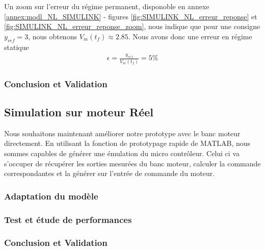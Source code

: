 		Un zoom sur l'erreur du régime permanent, disponoble en annexe \ref{annex:modl_NL_SIMULINK} - figures \ref{fig:SIMULINK_NL_erreur_reponse} et \ref{fig:SIMULINK_NL_erreur_reponse_zoom}, nous indique que pour une consigne $y_{ref} = 3$, nous obtenons $V_m(t_f)\approx 2.85$. Nous avons donc une erreur en régime statique \begin{align*}
		\epsilon = \frac{y_{ref}}{V_m(t_f)} = 5\%
		\end{align*}
		\subsubsection{Conclusion et Validation}
	\subsection{Simulation sur moteur Réel}
		Nous souhaitons maintenant améliorer notre prototype avec le banc moteur directement. En utilisant la fonction de prototypage rapide de MATLAB, nous sommes capables de générer une émulation du micro contrôleur. Celui ci va s'occuper de récupérer les sorties mesurées du banc moteur, calculer la commande correspondantes et la générer sur l'entrée de commande du moteur. 
		\subsubsection{Adaptation du modèle}
		\subsubsection{Test et étude de performances}
		\subsubsection{Conclusion et Validation}
		
